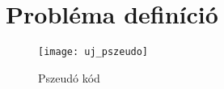 \chapter{Probléma definíció}
\begin{figure}[H]
\begin{center}
\texttt{[image: uj\_pszeudo]}
\caption{Pszeudó kód}
\label{uj_pszeudo}
\end{center}
\end{figure}